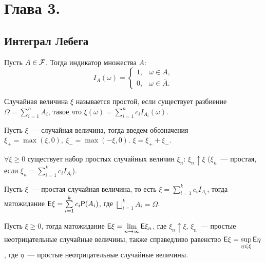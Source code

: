 \section{Глава 3.}

\subsection{Интеграл Лебега}
\begin{definition}
    Пусть $A \in \mathcal{F}$. Тогда индикатор множества $A$:
    \begin{equation*}
        I_A(\omega) = 
         \begin{cases}
           1,    &   \omega \in A,   \\
           0,    &   \omega \in \overline{A}.
         \end{cases}
        \end{equation*}
\end{definition}

\begin{definition}
    Случайная величина $\xi$ называется простой, если существует разбиение $\Omega = \sum\limits_{i=1}^nA_i$, такое что $ \xi(\omega) = \sum\limits_{i=1}^n c_iI_{A_i}(\omega)$.
\end{definition}

\begin{definition}
    Пусть $\xi$~--- случайная величина, тогда введем обозначения $\xi_+ = \max(\xi, 0),\  \xi_- = \max(-\xi, 0)$. $\xi = \xi_+ + \xi_-$.
\end{definition}

\begin{lemma}[][б/д]
	$\forall \xi \geqslant 0$ существует набор простых случайных величин $\xi_n$: $\xi_n \uparrow \xi$ ($\xi_n$~--- простая, если $\xi_n = \sum\limits_{i = 1}^k c_iI_{A_i}$).
\end{lemma}

\begin{definition}
	Пусть $\xi$~--- простая случайная величина, то есть $\xi = \sum\limits_{i = 1}^k c_iI_{A_i}$, тогда матожидание $\mathsf{E} \xi = \sum\limits_{i = 1}^k c_i\mathsf{P}(A_i)$, где $\bigsqcup\limits_{i=1}^k A_i = \Omega$.
\end{definition}

\begin{definition}
	Пусть $\xi \geqslant 0$, тогда матожидание $\mathsf{E} \xi = \lim\limits_{n \rightarrow \infty} \mathsf{E} \xi_n$, где $\xi_n \uparrow \xi$, $\xi_n$~--- простые неотрицательные случайные величины, также справедливо равенство $\mathsf{E} \xi = \sup\limits_{\eta \leqslant \xi}\mathsf{E}\eta$, где $\eta$~--- простые неотрицательные случайные величины. 
\end{definition}

